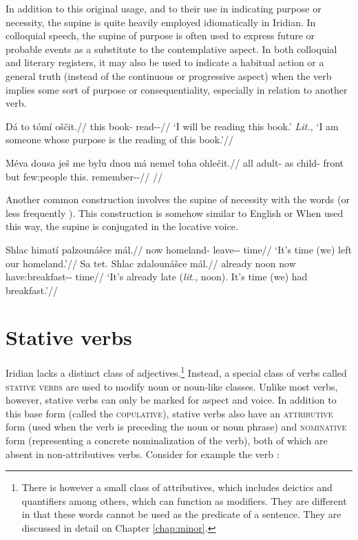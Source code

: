 In addition to this original usage, and to their use in indicating purpose or
necessity, the supine is quite heavily employed idiomatically in
Iridian. In colloquial speech, the supine of purpose is often used to express
future or probable events as a substitute to the contemplative aspect. In both
colloquial and literary registers, it may also be used to indicate a habitual
action or a general truth (instead of the continuous or progressive aspect) when
the verb implies some sort of purpose or consequentiality, especially in
relation to another verb.

\pex
\begingl
\gla Dá to tómí oščit.//
\glb \First{}\Sg{} this book-\Gen{} read-\Av{}-\SupP{}//
\glft `I will be reading this book.' \emph{Lit.,} `I am someone whose purpose is the reading of this book.'//
\endgl
\xe

\pex
\begingl
\gla Méva dousa ješ me bylu dnou má nemel toha ohlečit.//
\glb all adult-\Acc{} \Exst{} as child-\Ins{} front but few:people this.\Acc{} remember-\Av{}-\SupP{}//
\glft {}//
\endgl
\xe

Another common construction involves the supine of necessity with the words
  (or less frequently ). This
construction is somehow similar to English  or  When used this way, the supine is
conjugated in the locative voice.

\pex
\begingl
\gla Shlac himatí palzounášce mál.//
\glb now homeland-\Gen{} leave-\Lv{}-\SupN{} time//
\glft `It's time (we) left our homeland.'//
\endgl
\xe
\pex
\begingl
\gla Sa tet. Shlac zdalounášce mál.//
\glb already noon now have:breakfast-\Lv{}-\SupN{} time//
\glft `It's already late (\emph{lit.,} noon). It's time (we) had breakfast.'//
\endgl
\xe

\section{Stative verbs}\label{sec:statives}

Iridian lacks a distinct class of adjectives.\footnote{There is however a small
class of attributives, which includes deictics and
quantifiers among others, which can function as modifiers.
They are different in that these words cannot be used as the
predicate of a sentence. They are discussed in detail on
Chapter \ref{chap:minor}.} Instead, a special class of verbs called {\scshape
stative verbs} are used to modify noun or noun-like classes. Unlike most verbs,
however, stative verbs can only be marked for aspect and voice. In addition to
this base form (called the {\scshape copulative}), stative verbs also have an
{\scshape attributive} form (used when the verb is preceding the noun or noun
phrase) and {\scshape nominative} form (representing a concrete nominalization
of the verb), both of which are absent in non-attributives verbs. Consider for
example the verb  :

